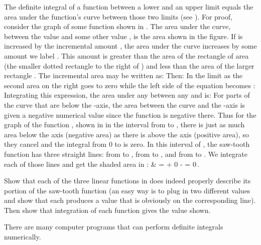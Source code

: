 {
The definite integral of a function between a lower and an upper limit equals the area under
the function's curve between those two limits (see ).
For proof, consider the graph of some function  shown in .
The area under the curve, between the value  and some other value ,
is the area  shown in the figure.
If  is increased by the incremental amount , the area under the
curve increases by some amount we label .
This amount  is greater than the area of the rectangle of area
 (the smaller dotted rectangle to the right of ) and less than the area of the
larger rectangle .
The incremental area may be written as:
%
%
Then:
%
%
In the limit as  the second area on the right goes
to zero while the left side of the equation becomes :
%
%
Integrating this expression, the area under any  between any  and
 is:
%
%
For parts of the curve that are below the -axis, the area between the
curve and the -axis is given a negative numerical value since the
function is negative there.
Thus for the graph of the  function , shown in  in the interval
from  to , there is just as much area below the axis
(negative area) as there is above the axis (positive area), so they cancel
and the integral from 0 to   is zero.
In this interval of , the saw-tooth function has three straight lines:
from  to , from  to , and from  to .
We integrate each of those lines and get the shaded area in :
%
          {& =  + 0 -  = 0\,.}
%

%
\tryit Show that each of the three linear functions in  does indeed properly describe its
portion of the saw-tooth function (an easy way is to plug in two different  values and show that
each produces a  value that is obviously on the corresponding line).
Then show that integration of each function gives the value shown.

There are many computer programs that can perform definite integrals numerically.
%
} %
